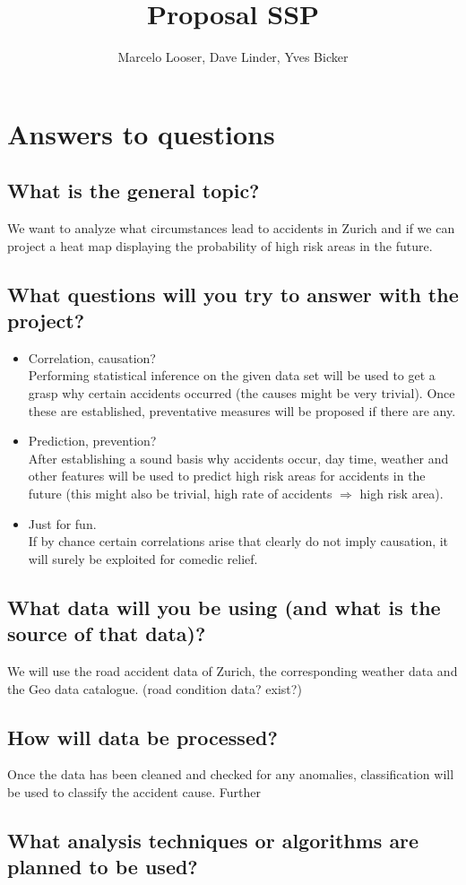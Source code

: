 \documentclass{article}
\title{Proposal SSP}
\author{Marcelo Looser, Dave Linder, Yves Bicker}
\begin{document}
\maketitle

\section{Answers to questions}

\subsection{What is the general topic?}
We want to analyze what circumstances lead to accidents in Zurich and if we can project a heat map displaying the probability of high risk areas in the future.   
\subsection{What questions will you try to answer with the project?}
\begin{itemize}
    \item Correlation, causation?\vspace{0.2cm}\\
     Performing statistical inference on the given data set will be used to get a grasp why certain accidents occurred (the causes might be very trivial). Once these are established, preventative measures will be proposed if there are any. 
     
    \item Prediction, prevention? \vspace{0.2cm}\\
    After establishing a sound basis why accidents occur, day time, weather and other features will be used to predict high risk areas for accidents in the future (this might also be trivial, high rate of accidents $\Rightarrow$ high risk area). 
    
    \item Just for fun. \vspace{0.2cm}\\
    If by chance certain correlations arise that clearly do not imply causation, it will surely be exploited for comedic relief.  
\end{itemize}

\subsection{What data will you be using (and what is the source of that data)?}
We will use the road accident data of Zurich, the corresponding weather data and the Geo data catalogue. (road condition data? exist?)

\subsection{How will data be processed?}
Once the data has been cleaned and checked for any anomalies, classification will be used to classify the accident cause. Further 

\subsection{What analysis techniques or algorithms are planned to be used?}
\end{document}
